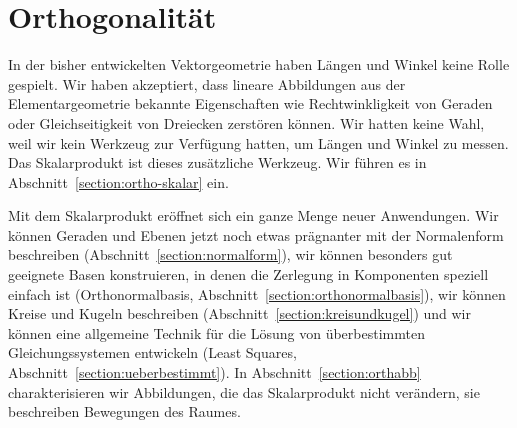 %
%
%
\chapter{Orthogonalität\label{chapter:orthogonalitaet}}
\rhead{}
In der bisher entwickelten Vektorgeometrie haben Längen und Winkel keine 
Rolle gespielt.
Wir haben akzeptiert, dass lineare Abbildungen aus der Elementargeometrie
bekannte Eigenschaften wie Rechtwinkligkeit von Geraden oder Gleichseitigkeit
von Dreiecken zerstören können.
Wir hatten keine Wahl, weil wir kein Werkzeug zur Verfügung hatten, 
um Längen und Winkel zu messen.
Das Skalarprodukt ist dieses zusätzliche Werkzeug.
Wir führen es in Abschnitt~\ref{section:ortho-skalar} ein.

Mit dem Skalarprodukt eröffnet sich ein ganze Menge neuer Anwendungen.
Wir können Geraden und Ebenen jetzt noch etwas prägnanter mit
der Normalenform beschreiben (Abschnitt~\ref{section:normalform}),
wir können besonders gut geeignete Basen konstruieren, in denen die
Zerlegung in Komponenten speziell einfach ist
(Orthonormalbasis, Abschnitt~\ref{section:orthonormalbasis}),
wir können Kreise und Kugeln
beschreiben (Abschnitt~\ref{section:kreisundkugel}) und wir können eine
allgemeine Technik für die Lösung von überbestimmten Gleichungssystemen
entwickeln (Least Squares, Abschnitt~\ref{section:ueberbestimmt}).
In Abschnitt~\ref{section:orthabb} charakterisieren wir Abbildungen,
die das Skalarprodukt nicht verändern, sie beschreiben Bewegungen
des Raumes.

%








